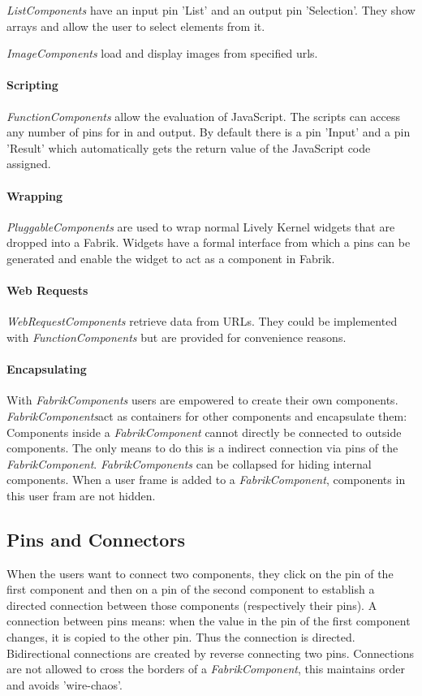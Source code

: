 \documentclass[pdftex, times, 10pt, twocolumn]{article}
\begin{document}
{\em ListComponents} have an input pin 'List' and an output pin 'Selection'. They show arrays and allow the user to select elements from it. 

{\em ImageComponents} load and display images from specified urls. 



\paragraph{Scripting}
{\em FunctionComponents} allow the evaluation of JavaScript. The scripts can access any  number of pins for in and output. By default there is a pin 'Input' and a pin 'Result' which automatically gets the return value of the JavaScript code assigned. 



\paragraph{Wrapping}
{\em PluggableComponents} are used to wrap normal Lively Kernel widgets that are dropped into a Fabrik. Widgets have a formal interface from which a pins can be generated and enable the widget to act as a component in Fabrik.  



\paragraph{Web Requests}
{\em WebRequestComponents} retrieve data from URLs. They could be implemented with {\em FunctionComponents} but are provided for convenience reasons.   



\paragraph{Encapsulating}
With {\em FabrikComponents} users are empowered to create their own components. {\em FabrikComponents}act as containers for other components and encapsulate them: Components inside a {\em FabrikComponent} cannot directly be connected to outside components. The only means to do this is a indirect connection via pins of the {\em FabrikComponent}. {\em FabrikComponents} can be collapsed for hiding internal components. When a user frame is added to a {\em FabrikComponent}, components in this user fram are not hidden.  



\subsection{Pins and Connectors}
When the users want to connect two components, they click on the pin of the first component and then on a pin of the second component to establish a directed connection between those components (respectively their pins). A connection between pins means: when the value in the pin of the first component changes, it is copied to the other pin. Thus the connection is directed. Bidirectional connections are created by reverse connecting two pins. Connections are not allowed to cross the borders of a {\em FabrikComponent}, this maintains order and avoids 'wire-chaos'. 
\end{document}
